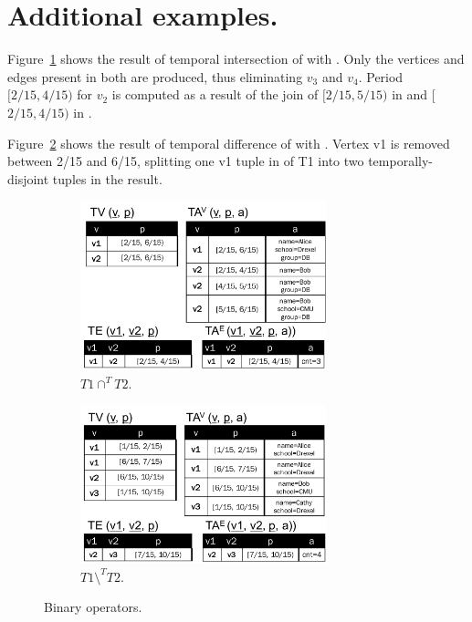 \appendix 

\section{Additional examples.}
\label{sec:app:examples}

Figure~\ref{fig:tg_inter} shows the result of temporal intersection
of  with .  Only the vertices and edges present in
both \tgs are produced, thus eliminating $v_3$ and $v_4$.  Period
$[2/15, 4/15)$ for $v_2$ is computed as a result of the join of
$[2/15, 5/15)$ in  and [$2/15, 4/15)$ in .

Figure~\ref{fig:tg_diff} shows the result of temporal difference
of  with .  Vertex v1 is removed between 2/15 and
6/15, splitting one v1 tuple in \tv of T1 into two temporally-disjoint
tuples in the result.

\begin{figure}[b]
\centering
\begin{subfigure}{3in}
\includegraphics[width=2.8in]{figs/T1_inter_T2_rel.pdf}
\caption{$T1 \cap^T T2$.}
\label{fig:tg_inter}
\end{subfigure}
\begin{subfigure}{3in}
\includegraphics[width=2.8in]{figs/T1_diff_T2_rel.pdf}
\caption{$T1 \setminus^T T2$.}
\vspace{-0.2cm}
\label{fig:tg_diff}
\end{subfigure}
\caption{Binary operators.}
\label{fig:binary}
\vspace{-0.2cm}
\end{figure}



